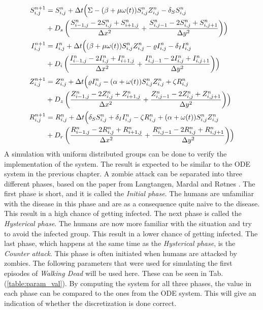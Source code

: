 \documentclass[%
twoside,                 %
final,                   %
chapterprefix=true,      %
open=right               %
10pt]{book}
\begin{document}
\begin{equation}\label{eq:SIZR_disc2}
	\begin{aligned}
    S^{n+1}_{i,j} &= S^n_{i,j} + \Delta t \Bigl( \Sigma - (\beta+\mu \omega(t))S^{n}_{i,j}Z^{n}_{i,j}- \delta_S S^{n}_{i,j} \\
        &+ D_s\left(\frac{S^{n}_{i-1,j}-2S^{n}_{i,j}+S^{n}_{i+1,j}}{\Delta x^2}+\frac{S^{n}_{i,j-1}-2S^{n}_{i,j}+S^{n}_{i,j+1}}{\Delta y^2}\right)\Bigr) \\
    I^{n+1}_{i,j} &= I^n_{i,j} + \Delta t \Bigl((\beta+\mu \omega(t))S^{n}_{i,j}Z^{n}_{i,j}-\varrho I^{n}_{i,j}- \delta_I I^{n}_{i,j} \\
        &+ D_i\left(\frac{I^{n}_{i-1,j}-2I^{n}_{i,j}+I^{n}_{i+1,j}}{\Delta x^2}+\frac{I^{n}_{i,j-1}-2I^{n}_{i,j}+I^{n}_{i,j+1}}{\Delta y^2}\right)\Bigr) \\ 
    Z^{n+1}_{i,j} &= Z^n_{i,j} +\Delta t \Bigl( \varrho I^{n}_{i,j}-(\alpha+\omega(t))S^{n}_{i,j}Z^{n}_{i,j}+ \zeta R^{n}_{i,j} \\
        &+D_z\left(\frac{Z^{n}_{i-1,j}-2Z^{n}_{i,j}+Z^{n}_{i+1,j}}{\Delta x^2}+\frac{Z^{n}_{i,j-1}-2Z^{n}_{i,j}+Z^{n}_{i,j+1}}{\Delta y^2}\right)\Bigr) \\
    R^{n+1}_{i,j} &= R^n_{i,j} +\Delta t \Bigl(\delta_S S^{n}_{i,j}+\delta_I I^{n}_{i,j}-\zeta R^{n}_{i,j}+(\alpha+\omega(t))S^{n}_{i,j}Z^{n}_{i,j} \\
        &+D_r\left(\frac{R^{n}_{i-1,j}-2R^{n}_{i,j}+R^{n}_{i+1,j}}{\Delta x^2}+\frac{R^{n}_{i,j-1}-2R^{n}_{i,j}+R^{n}_{i,j+1}}{\Delta y^2}\right)\Bigr) 
	\end{aligned}
\end{equation}
A simulation with uniform distributed groups can be done to verify the implementation of the system. The result is expected to be similar to the ODE system in the previous chapter. A zombie attack can be separated into three different phases, based on the paper from Langtangen, Mardal and Røtnes \cite{zombie-math}. The first phase is short, and it is called the \emph{Initial phase}. The humans are unfamiliar with the disease in this phase and are as a consequence quite naive to the disease. This result in a high chance of getting infected. The next phase is called the \emph{Hysterical phase}. The humans are now more familiar with the situation and try to avoid the infected group. This result in a lower chance of getting infected. The last phase, which happens at the same time as the \emph{Hysterical phase}, is the \emph{Counter attack}. This phase is often initiated when humans are attacked by zombies. The following parameters that were used for simulating the first episodes of \emph{Walking Dead} will be used here. These can be seen in Tab.(\ref{table:param_val}). By computing the system for all three phases, the value in each phase can be compared to the ones from the ODE system. This will give an indication of whether the discretization is done correct. 
\end{document}
